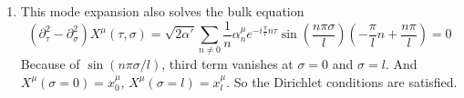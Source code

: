 \begin{enumerate}[label=(\alph*)]
	\item This mode expansion also solves the bulk equation
		\begin{equation*}
			(\partial_\tau^2 - \partial_\sigma^2) X^\mu (\tau, \sigma) = \sqrt{2\alpha'} \sum_{n\neq 0} \frac{1}{n } \alpha_n^\mu e^{-i \frac{\pi}{l} n \tau} \sin(\frac{n\pi\sigma}{l}) \left( - \frac{\pi}{l} n + \frac{n\pi}{l} \right) = 0
		\end{equation*}
		Because of $\sin(n\pi\sigma/l)$, third term vanishes at $\sigma=0$ and $\sigma=l$. And $X^\mu(\sigma=0) = x_0^\mu$, $X^\mu(\sigma=l) = x_l^\mu$. So the Dirichlet conditions are satisfied.
\end{enumerate}

